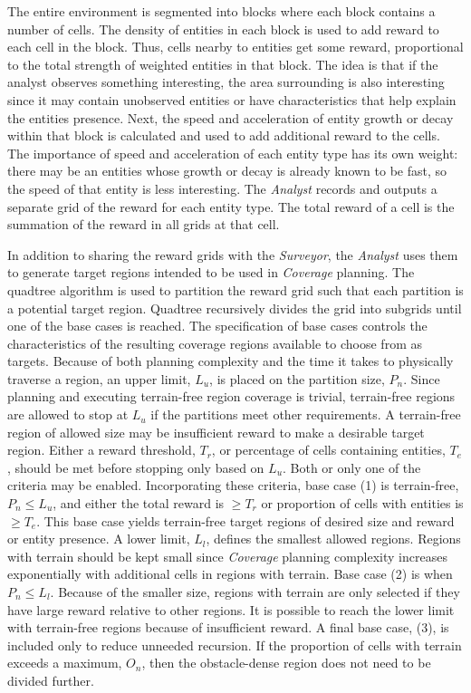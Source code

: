 \documentclass{tamuccthesis}
\begin{document}
The entire environment is segmented into blocks where each block contains a number of cells. The density of entities in each block is used to add reward to each cell in the block. Thus, cells nearby to entities get some reward, proportional to the total strength of weighted entities in that block. The idea is that if the analyst observes something interesting, the area surrounding is also interesting since it may contain unobserved entities or have characteristics that help explain the entities presence. Next, the speed and acceleration of entity growth or decay within that block is calculated and used to add additional reward to the cells. The importance of speed and acceleration of each entity type has its own weight: there may be an entities whose growth or decay is already known to be fast, so the speed of that entity is less interesting. The \textit{Analyst} records and outputs a separate grid of the reward for each entity type. The total reward of a cell is the summation of the reward in all grids at that cell. 

In addition to sharing the reward grids with the \textit{Surveyor}, the \textit{Analyst} uses them to generate target regions intended to be used in \textit{Coverage} planning. The quadtree algorithm is used to partition the reward grid such that each partition is a potential target region. Quadtree recursively divides the grid into subgrids until one of the base cases is reached. The specification of base cases controls the characteristics of the resulting coverage regions available to choose from as targets. Because of both planning complexity and the time it takes to physically traverse a region, an upper limit, $L_u$, is placed on the partition size, $P_n$. Since planning and executing terrain-free region coverage is trivial, terrain-free regions are allowed to stop at $L_u$ if the partitions meet other requirements. A terrain-free region of allowed size may be insufficient reward to make a desirable target region. Either a reward threshold, $T_r$, or percentage of cells containing entities, $T_e$, should be met before stopping only based on $L_u$. Both or only one of the criteria may be enabled. 
Incorporating these criteria, base case (1) is terrain-free, $P_n \leq L_u$, and either the total reward is $\geq T_r$ or proportion of cells with entities is $\geq T_e$. This base case yields terrain-free target regions of desired size and reward or entity presence. A lower limit, $L_l$, defines the smallest allowed regions. Regions with terrain should be kept small since \textit{Coverage} planning complexity increases exponentially with additional cells in regions with terrain. Base case (2) is when $P_n \leq L_l$. Because of the smaller size, regions with terrain are only selected if they have large reward relative to other regions. It is possible to reach the lower limit with terrain-free regions because of insufficient reward. A final base case, (3), is included only to reduce unneeded recursion. If the proportion of cells with terrain exceeds a maximum, $O_n$, then the obstacle-dense region does not need to be divided further. 
\end{document}
